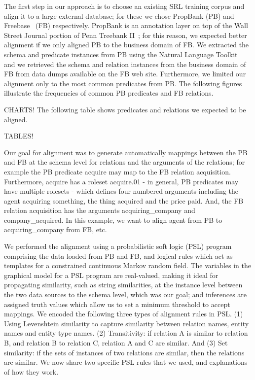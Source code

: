 The first step in our approach is to choose an existing SRL training corpus and align it to a large external database; for these we chose PropBank (PB) and Freebase~\cite{bollacker_freebase:_2008} (FB) respectively.
PropBank is an annotation layer on top of the Wall Street Journal portion of Penn Treebank II~\cite{marcus_building_1993}; for this reason, we expected better alignment if we only aligned PB to the business domain of FB.
We extracted the schema and predicate instances from PB using the Natural Language Toolkit~\cite{bird_nltk:_2006} and we retrieved the schema and relation instances from the business domain of FB from data dumps available on the FB web site.
Furthermore, we limited our alignment only to the most common predicates from PB.  The following figures illustrate the frequencies of common PB predicates and FB relations.

CHARTS! 
The following table shows predicates and relations we expected to be aligned.

TABLES!

Our goal for alignment was to generate automatically mappings between the PB and FB at the schema level for relations and the arguments of the relations; for example the PB predicate acquire may map to the FB relation acquisition.
Furthermore, acquire has a roleset acquire.01 - in general, PB predicates may have multiple rolesets - which defines four numbered arguments including the agent acquiring something, the thing acquired and the price paid.
And, the FB relation acquisition has the arguments acquiring\_company and company\_acquired.
In this example, we want to align agent from PB to acquiring\_company from FB, etc. 

We performed the alignment using a probabilistic soft logic (PSL) program~\cite{brocheler_probabilistic_2012} comprising the data loaded from PB and FB, and logical rules which act as templates for a constrained continuous Markov random field.
The variables in the graphical model for a PSL program are real-valued, making it ideal for propagating similarity, such as string similarities, at the instance level between the two data sources to the schema level, which was our goal; and inferences are assigned truth values which allow us to set a minimum threshold to accept mappings.
We encoded the following three types of alignment rules in PSL.
(1) Using Levenshtein similarity to capture similarity between relation names, entity names and entity type names.
(2) Transitivity:  if relation A is similar to relation B, and relation B to relation C, relation A and C are similar.
And (3) Set similarity:  if the sets of instances of two relations are similar, then the relations are similar.
We now share two specific PSL rules that we used, and explanations of how they work.

